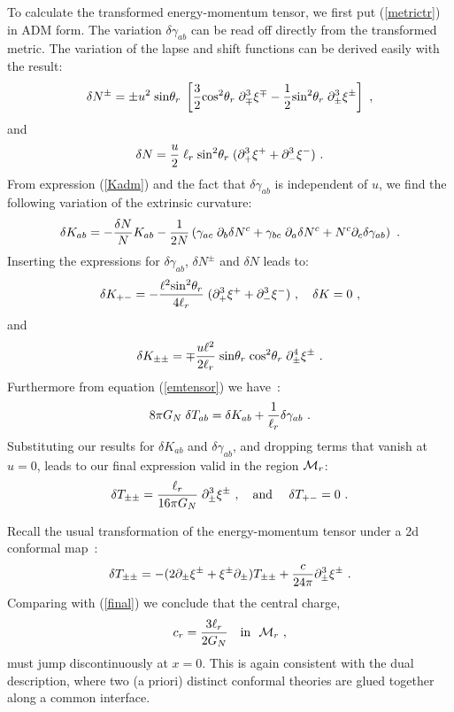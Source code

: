 \documentclass[a4paper,12pt,oneside]{article}
\begin{document}
To calculate the transformed energy-momentum tensor, we first put
(\ref{metrictr}) in 
 ADM form. The variation   $\delta\gamma_{ab}$ can be 
read off directly
from  the transformed metric. The variation of the lapse and
shift functions can be derived easily with the result:
\begin{equation}
\delta N^\pm = \pm {u^2}\;{\rm sin}\theta_r\;
\left[{3\over 2}{\rm cos}^2\theta_r \; \partial_\mp^3\xi^\mp -
{1\over 2}{\rm sin}^2\theta_r \; \partial_\pm^3\xi^\pm\right]\ , 
\end{equation}
and
\begin{equation}
\delta N = {u \over 2}\;\ell_r\; {\rm sin}^2\theta_r
\; (\partial_+^3\xi^+ +
\partial_-^3\xi^-)\ .
\end{equation}
From  expression (\ref{Kadm}) 
and the fact that $\delta\gamma_{ab}$ is independent
of $u$,   we find the following variation of  the extrinsic curvature:
\begin{equation}
\delta K_{ab} = -{\delta N\over N} K_{ab} -{1\over 2N} \left(
\gamma_{ac}\;\partial_b\delta N^c+ \gamma_{bc}\;\partial_a\delta
 N^c +N^c\partial_c\delta\gamma_{ab}\right)
\ .
\end{equation}
Inserting the expressions for $\delta\gamma_{ab}$, $\delta N^\pm$
and $\delta N$  leads to:
\begin{equation}
\delta K_{+-} = -{\ell^2 
{\rm sin}^2\theta_r\over 4\ell_r}\; (\partial_+^3\xi^+ +
\partial_-^3\xi^-)\ , \ \ \ 
\delta K = 0\ ,
\end{equation}
and 
\begin{equation}
\delta K_{\pm\pm} = \mp {u \ell^2 \over 2\ell_r}\;{\rm sin}\theta_r\;
{\rm cos}^2\theta_r\; \partial^4_\pm\xi^\pm\ . 
\end{equation}
Furthermore from equation (\ref{emtensor}) we have~: 
\begin{equation}
8\pi G_N \; \delta T_{ab} = \delta K_{ab} + 
{1\over \ell_r} \delta\gamma_{ab}\ .
\end{equation}
Substituting our  results for $\delta K_{ab}$ and $\delta\gamma_{ab}$,
and dropping terms that vanish at $u=0$,
leads to  our  final expression valid in the region ${\cal M}_r$:
\begin{equation}
\delta T_{\pm\pm} =  {\ell_r \over 16\pi G_N}\;
 \partial_\pm^3 \xi^\pm \ , \ \ \ {\rm and} \ \ \ \
\delta T_{+-} = 0\ . 
\label{final}
\end{equation}


  Recall  the usual transformation of
the energy-momentum tensor under a  2d conformal map~:
\begin{equation}
\delta T_{\pm\pm} = - (2\partial_\pm \xi^\pm  +
 \xi^\pm\partial_\pm) T_{\pm\pm} + {c\over 24\pi} \partial^3_\pm \xi^\pm\ . 
\end{equation}
Comparing with (\ref{final}) we conclude that the 
central charge, 
\begin{equation}
c_r = {3\ell_r\over 2G_N}\ \ \ {\rm in}\ \ {\cal M}_r\ ,
\end{equation}
must jump  discontinuously at $x=0$. This is again
consistent with the dual description,  where two (a priori) distinct
conformal theories are glued together along a common interface.  
\end{document}
